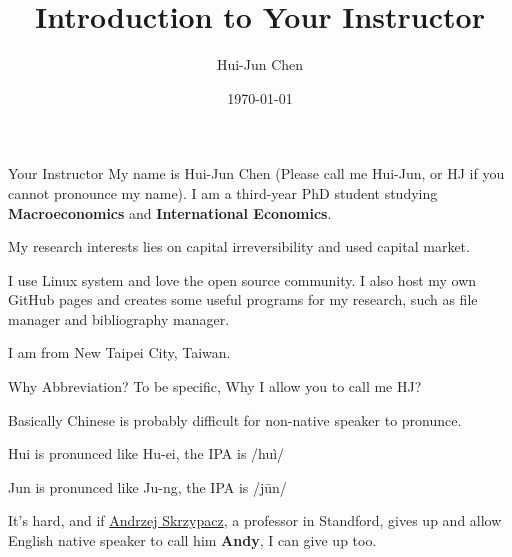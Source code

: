 \documentclass{beamer}
\title{Introduction to Your Instructor}
\author{Hui-Jun Chen}
\institute{The Ohio State University}
\date{\today}
\begin{document}
\maketitle

\begin{frame}{Your Instructor}
    My name is Hui-Jun Chen (Please call me Hui-Jun, or HJ if you cannot pronounce my name). I am a third-year PhD student studying  \textbf{Macroeconomics} and  \textbf{International Economics}.

    My research interests lies on capital irreversibility and used capital market.

    I use Linux system and love the open source community. I also host my own GitHub pages and creates some useful programs for my research, such as file manager and bibliography manager.

    I am from New Taipei City, Taiwan.
\end{frame}

\begin{frame}{Why Abbreviation?}
\label{slide:Why_Abbreviation_}
    To be specific, Why I allow you to call me HJ?

    Basically Chinese is probably difficult for non-native speaker to pronunce.

    Hui is pronunced like Hu-ei, the IPA is /huì/

    Jun is pronunced like Ju-ng, the IPA is /jūn/

    It's hard, and if \href{https://web.stanford.edu/~skrz/MyName.htm}{Andrzej Skrzypacz}, a professor in Standford, gives up and allow English native speaker to call him \textbf{Andy}, I can give up too.
\end{frame}
\end{document}
